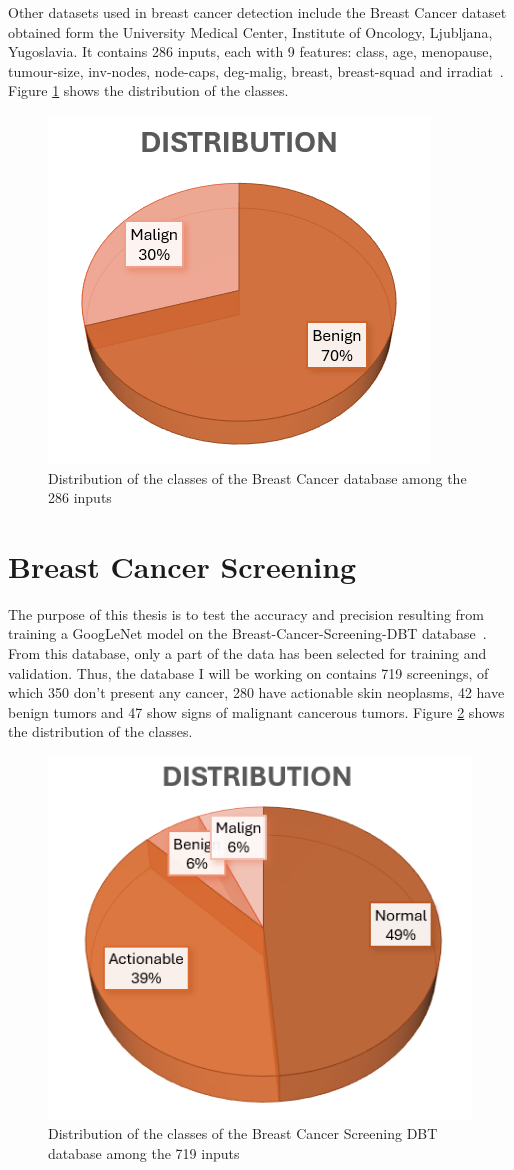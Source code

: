 Other datasets used in breast cancer detection include the Breast Cancer dataset obtained form the University Medical Center, Institute of Oncology, Ljubljana, Yugoslavia. It contains 286 inputs, each with 9 features: class, age, menopause, tumour-size, inv-nodes, node-caps, deg-malig, breast, breast-squad and irradiat~\cite{link10}. Figure \ref{fig:fig29} shows the distribution of the classes.
\begin{figure}[hb!]
    \centering
    \includegraphics[width=0.5\linewidth]{figures/Figure35.png}
    \caption{Distribution of the classes of the Breast Cancer database among the 286 inputs}
    \label{fig:fig29}
\end{figure}

\section{Breast Cancer Screening}

The purpose of this thesis is to test the accuracy and precision resulting from training a GoogLeNet model on the Breast-Cancer-Screening-DBT database~\cite{link4}. From this database, only a part of the data has been selected for training and validation. Thus, the database I will be working on contains 719 screenings, of which 350 don't present any cancer, 280 have actionable skin neoplasms, 42 have benign tumors and 47 show signs of malignant cancerous tumors. Figure \ref{fig:fig30} shows the distribution of the classes.

\begin{figure}[hb!]
    \centering
    \includegraphics[width=0.5\linewidth]{figures/Figure36.png}
    \caption{Distribution of the classes of the Breast Cancer Screening DBT database among the 719 inputs}
    \label{fig:fig30}
\end{figure}

